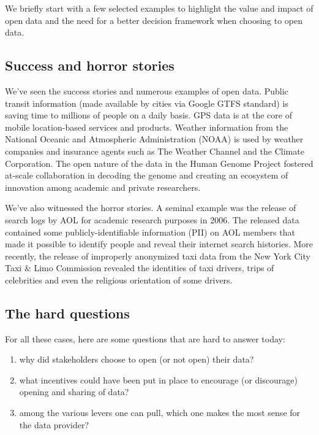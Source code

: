 \documentclass[]{acm_proc_article-sp}
\begin{document}
We briefly start with a few selected examples to highlight the value and
impact of open data and the need for a better decision framework when
choosing to open data.

\subsection{Success and horror
stories}\label{success-and-horror-stories}

We've seen the success stories and numerous examples of open data.
Public transit information (made available by cities via Google GTFS
standard) is saving time to millions of people on a daily basis. GPS
data is at the core of mobile location-based services and products.
Weather information from the National Oceanic and Atmospheric
Administration (NOAA) is used by weather companies and insurance agents
such as The Weather Channel and the Climate Corporation. The open nature
of the data in the Human Genome Project fostered at-scale collaboration
in decoding the genome and creating an ecosystem of innovation among
academic and private researchers.

We've also witnessed the horror stories. A seminal example was the
release of search logs by AOL for academic research purposes in 2006.
The released data contained some publicly-identifiable information (PII)
on AOL members that made it possible to identify people and reveal their
internet search histories. More recently, the release of improperly
anonymized taxi data from the New York City Taxi \& Limo Commission
revealed the identities of taxi drivers, trips of celebrities and even
the religious orientation of some drivers.

\subsection{The hard questions}\label{the-hard-questions}

For all these cases, here are some questions that are hard to answer
today:

\vspace{0mm}

\begin{enumerate}
\itemsep1pt\parskip0pt
\item
  why did stakeholders choose to open (or not open) their data?
\item
  what incentives could have been put in place to encourage (or
  discourage) opening and sharing of data?
\item
  among the various levers one can pull, which one makes the most sense
  for the data provider?
\end{enumerate}
\end{document}
